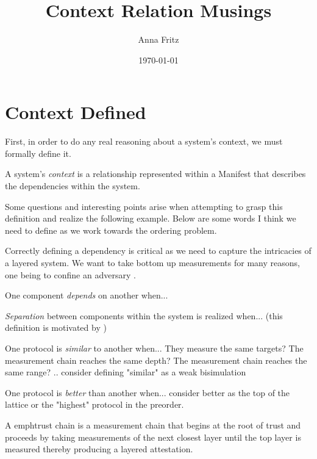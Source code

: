 \documentclass[12pt, letterpaper]{article}
\title{Context Relation Musings}
\author{Anna Fritz}
\date{\today}
\begin{document}
\maketitle

\section{Context Defined}

First, in order to do any real reasoning about a system's context, we must formally define it. 

\begin{defn}[Context]
  A system's \emph{context} is a relationship represented within a Manifest that describes the dependencies within the system. 
\end{defn}

Some questions and interesting points arise when attempting to grasp this definition and realize the following example. Below are some words I think we need to define as we work towards the ordering problem. 

Correctly defining a dependency is critical as we need to capture the intricacies of a layered system. We want to take bottom up measurements for many reasons, one being to confine an adversary \cite{Rowe::Bundling}.

\begin{defn}[Dependency] 
  One component \emph{depends} on another when... 
\end{defn}

\begin{defn}[Separation] 
  \emph{Separation} between components within the system is realized when... (this definition is motivated by \cite{Ramsdell::Orchestrating} )
\end{defn}

\begin{defn}[Similar] 
  One protocol is \emph{similar} to another when... They measure the same targets? The measurement chain reaches the same depth? The measurement chain reaches the same range? .. consider defining "similar" as a weak bisimulation
\end{defn}

\begin{defn}[Better] 
  One protocol is \emph{better} than another when... consider better as the top of the lattice or the "highest" protocol in the preorder. 
\end{defn}

\begin{defn}
  A emph{trust chain} is a measurement chain that begins at the root of trust and proceeds by taking measurements of the next closest layer until the top layer is measured thereby producing a layered attestation. 
\end{defn}
\end{document}
